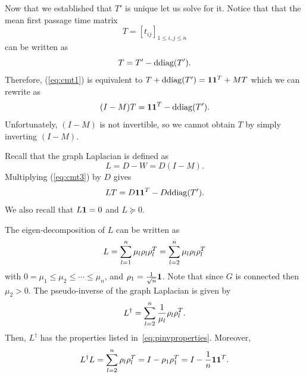 Now that we established that $T'$ is unique let us solve for it. Notice that that the mean first passage time matrix $$T = [t_{ij}]_{1\leq i,j \leq n}$$ can be written as
\begin{equation}
T = T' - \mathrm{ddiag}(T').
\end{equation}
Therefore, (\ref{eq:cmt1}) is equivalent to $T+\mathrm{ddiag}(T')=\mathbf{1}\mathbf{1}^T+MT$ which we can rewrite as
\begin{equation}
(I-M)T=\mathbf{1}\mathbf{1}^T-\mathrm{ddiag}(T').\label{eq:cmt3}
\end{equation}
Unfortunately, $(I-M)$ is not invertible, so we cannot obtain $T$ by simply inverting $(I-M)$.

Recall that the graph Laplacian is defined
as
\begin{equation}
L=D-W=D(I-M).\label{eq:graph_laplacian}
\end{equation}
Multiplying (\ref{eq:cmt3}) by $D$ gives
\begin{equation}
LT=D\mathbf{1}\mathbf{1}^T-D\mathrm{ddiag}(T').\label{eq:cmt4}
\end{equation}
We also recall that $L\mathbf{1}=0$ and $L\succeq 0$. 


The eigen-decomposition of $L$ can be written as
\begin{equation}
L=\sum_{l=1}^{n}\mu_{l}{\rho}_{l}{\rho}_{l}^{T} = \sum_{l=2}^{n}\mu_{l}{\rho}_{l}{\rho}_{l}^{T}
\end{equation}
with $0=\mu_{1}\leq\mu_{2}\leq\cdots\leq\mu_{n}$, and $\rho_1 = \frac{1}{\sqrt{n}}{\textbf 1}$. Note that since $G$ is connected then $\mu_{2}>0$. 
The pseudo-inverse of the graph Laplacian is given by
\begin{equation}
L^\dagger=\sum_{l=2}^{n}\frac{1}{\mu_{l}}{\rho}_{l}{\rho}_{l}^{T}.
\end{equation}
Then,  $L^\dagger$ has the  properties listed in~\eqref{eq:pinvproperties}. Moreover,
\begin{equation}
L^\dagger L=\sum_{l=2}^{n}{\rho}_{l}{\rho}_{l}^{T}=I-{\rho}_{1}{\rho}_{1}^{T} = I - \frac{1}{n}{\textbf 1}{\textbf 1}^T.\label{eq:cmt5}
\end{equation}

